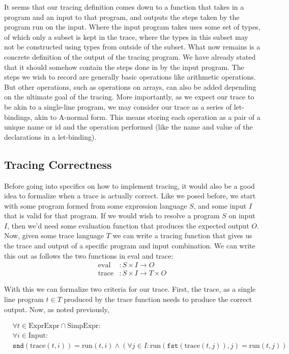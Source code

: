     It seems that our tracing definition comes down to a function that takes in a program and an input to that program, and outputs the steps taken by the program run on the input.
    Where the input program takes uses some set of types, of which only a subset is kept in the trace, where the types in this subset may not be constructed using types from outside of the subset.
    What now remains is a concrete definition of the output of the tracing program.
    We have already stated that it should somehow contain the steps done in by the input program.
    The steps we wish to record are generally basic operations like arithmetic operations.
    But other operations, such as operations on arrays, can also be added depending on the ultimate goal of the tracing.
    More importantly, as we expect our trace to be akin to a single-line program, we may consider our trace as a series of let-bindings, akin to A-normal form\cn.
    This means storing each operation as a pair of a unique name or id and the operation performed (like the name and value of the declarations in a let-binding).
    
    \subsection{Tracing Correctness} \label{sec:correctness}
        Before going into specifics on how to implement tracing, it would also be a good idea to formalize when a trace is actually correct.
        Like we posed before, we start with some program formed from some expression language $S$, and some input $I$ that is valid for that program.
        If we would wish to resolve a program $S$ on input $I$, then we'd need some evaluation function that produces the expected output $O$.
        Now, given some trace language $T$ we can write a tracing function that gives us the trace and output of a specific program and input combination.
        We can write this out as follows the two functions in eval and trace:
        \begin{align*}
            \text{eval}&:S\times I\to O\\
            \text{trace}&:S\times I\to T\times O
        \end{align*}

        With this we can formalize two criteria for our trace.
        First, the trace, as a single line program $t\in T$ produced by the trace function needs to produce the correct output.
        Now, as noted previously, 

        \begin{align*}
            &\forall t\in\text{ExprExpr}\cap\text{SimpExpr}:\\
            &\forall i\in\text{Input}:\\
            &\texttt{snd}(\text{trace}(t,i))=\text{run}(t,i)\wedge(\forall j\in I:\text{run}(\texttt{fst}(\text{trace}(t,j)),j)=\text{run}(t,j))
        \end{align*}

